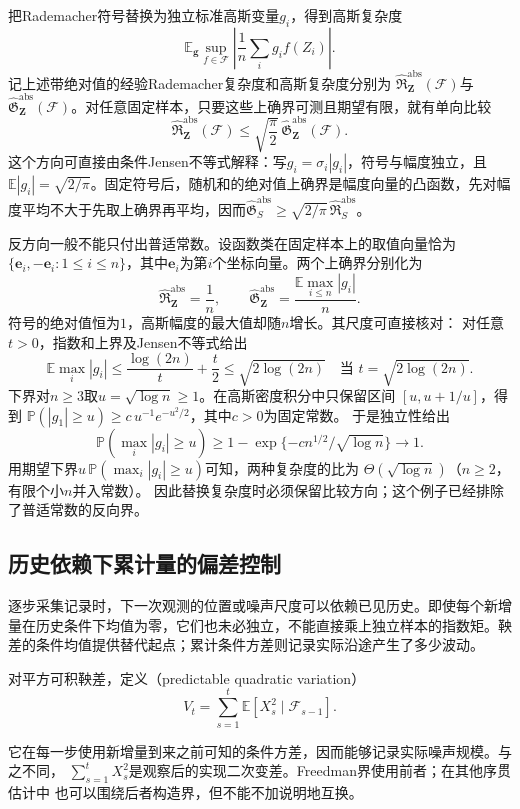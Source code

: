 把Rademacher符号替换为独立标准高斯变量\(g_i\)，得到高斯复杂度
\[ \mathbb{E}_{\bm{g}}
  \sup_{f\in\mathcal{F}}
  \left|\frac{1}{n}\sum_i g_i f(Z_i)\right|. \]
记上述带绝对值的经验Rademacher复杂度和高斯复杂度分别为
\(\widehat{\mathfrak{R}}_{\bm{Z}}^{\mathrm{abs}}(\mathcal{F})\)与
\(\widehat{\mathfrak{G}}_{\bm{Z}}^{\mathrm{abs}}(\mathcal{F})\)。对任意固定样本，只要这些上确界可测且期望有限，就有单向比较
\[
  \widehat{\mathfrak{R}}_{\bm{Z}}^{\mathrm{abs}}(\mathcal{F})
  \leq
  \sqrt{\frac{\pi}{2}}\,
  \widehat{\mathfrak{G}}_{\bm{Z}}^{\mathrm{abs}}(\mathcal{F}).
\]
这个方向可直接由条件Jensen不等式解释：写\(g_i=\sigma_i|g_i|\)，符号与幅度独立，且\(\mathbb E|g_i|=\sqrt{2/\pi}\)。固定符号后，随机和的绝对值上确界是幅度向量的凸函数，先对幅度平均不大于先取上确界再平均，因而\(\widehat{\mathfrak G}^{\mathrm{abs}}_S\geq\sqrt{2/\pi}\,\widehat{\mathfrak R}^{\mathrm{abs}}_S\)。

反方向一般不能只付出普适常数。设函数类在固定样本上的取值向量恰为
\(\{\bm e_i,-\bm e_i:1\leq i\leq n\}\)，其中\(\bm e_i\)为第\(i\)个坐标向量。两个上确界分别化为
\[
 \widehat{\mathfrak R}^{\mathrm{abs}}_{\bm Z}=\frac1n,\qquad
 \widehat{\mathfrak G}^{\mathrm{abs}}_{\bm Z}
   =\frac{\mathbb E\max_{i\leq n}|g_i|}{n}.
\]
符号的绝对值恒为\(1\)，高斯幅度的最大值却随\(n\)增长。其尺度可直接核对：
对任意\(t>0\)，指数和上界及Jensen不等式给出
\[
 \mathbb E\max_i|g_i|
 \leq\frac{\log(2n)}t+\frac t2
 \leq\sqrt{2\log(2n)}
 \quad\text{当 }t=\sqrt{2\log(2n)}.
\]
下界对\(n\geq3\)取\(u=\sqrt{\log n}\geq1\)。在高斯密度积分中只保留区间
\([u,u+1/u]\)，得到
\(\mathbb P(|g_1|\geq u)\geq c\,u^{-1}e^{-u^2/2}\)，其中\(c>0\)为固定常数。
于是独立性给出
\[
 \mathbb P(\max_i|g_i|\geq u)
 \geq1-\exp\{-cn^{1/2}/\sqrt{\log n}\}\longrightarrow1.
\]
用期望下界\(u\,\mathbb P(\max_i|g_i|\geq u)\)可知，两种复杂度的比为
\(\Theta(\sqrt{\log n})\)（\(n\geq2\)，有限个小\(n\)并入常数）。
因此替换复杂度时必须保留比较方向；这个例子已经排除了普适常数的反向界。

\subsection{历史依赖下累计量的偏差控制}

逐步采集记录时，下一次观测的位置或噪声尺度可以依赖已见历史。即使每个新增量在历史条件下均值为零，它们也未必独立，不能直接乘上独立样本的指数矩。鞅差的条件均值提供替代起点；累计条件方差则记录实际沿途产生了多少波动。
\begin{definition}[可预测二次变差]
  \label{def:stoch-predictable-quadratic-variation}
对平方可积鞅差，定义（predictable quadratic variation）
\begin{equation}
  V_t=\sum_{s=1}^{t}\mathbb{E}[X_s^2\mid\mathcal{F}_{s-1}].
  \label{eq:stoch-predictable-quadratic-variation}
\end{equation}
\end{definition}
它在每一步使用新增量到来之前可知的条件方差，因而能够记录实际噪声规模。与之不同，
$\sum_{s=1}^{t}X_s^2$是观察后的实现二次变差。Freedman界使用前者；在其他序贯估计中
也可以围绕后者构造界，但不能不加说明地互换。

